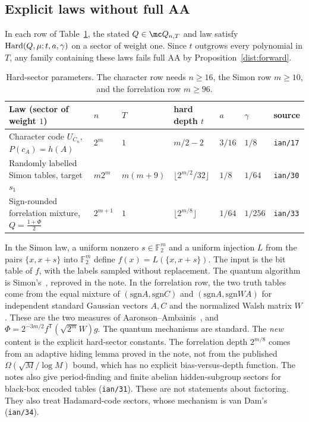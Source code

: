\subsection{Explicit laws without full AA}\label{dist:failures-sec}
\begin{theorem}\label{dist:failures}
In each row of Table~\ref{dist:table}, the stated \(Q\in\mc Q_{n,T}\) and law
satisfy \(\operatorname{Hard}(Q,\mu;t,a,\gamma)\) on a sector of weight one. Since \(t\)
outgrows every polynomial in \(T\), any family containing these laws fails full
AA by Proposition~\ref{dist:forward}.
\end{theorem}
\begin{table}[h]
\centering\small
\begin{tabular}{@{}lllllll@{}}
\toprule
Law (sector of weight \(1\)) & \(n\) & \(T\) & hard depth \(t\) & \(a\) & \(\gamma\) & source\\
\midrule
Character code \(U_{C_n}\), \(P(c_A)=h(A)\) & \(2^m\) & \(1\) & \(m/2-2\) & \(3/16\) & \(1/8\) & \texttt{ian/17}\\
Randomly labelled Simon tables, target \(s_1\) & \(m2^m\) & \(m(m+9)\) & \(\lfloor2^{m/2}/32\rfloor\) & \(1/8\) & \(1/64\) & \texttt{ian/30}\\
Sign-rounded forrelation mixture, \(Q=\frac{1+\Phi}2\) & \(2^{m+1}\) & \(1\) & \(\lfloor2^{m/8}\rfloor\) & \(1/64\) & \(1/256\) & \texttt{ian/33}\\
\bottomrule
\end{tabular}
\caption{Hard-sector parameters. The character row needs \(n\ge16\), the Simon
row \(m\ge10\), and the forrelation row \(m\ge96\).}\label{dist:table}
\end{table}
In the Simon law, a uniform nonzero \(s\in\mathbb F_2^m\) and a uniform injection
\(L\) from the pairs \(\{x,x+s\}\) into \(\mathbb F_2^m\) define
\(f(x)=L(\{x,x+s\})\). The input is the bit table of \(f\), with the labels
sampled without replacement. The quantum algorithm is Simon's~\cite{Sim97},
reproved in the note. In the forrelation row, the two truth tables come from
the equal mixture of \((\mathrm{sgn}A,\mathrm{sgn}C)\) and
\((\mathrm{sgn}A,\mathrm{sgn}WA)\) for independent standard Gaussian vectors
\(A,C\) and the normalized Walsh matrix \(W\). These are the two measures of
Aaronson--Ambainis~\cite{AA15}, and
\(\Phi=2^{-3m/2}f^{\mathsf T}(\sqrt{2^m}W)g\). The quantum mechanisms are
standard. The \emph{new} content is the explicit hard-sector constants. The
forrelation depth \(2^{m/8}\) comes from an adaptive hiding lemma proved in the
note, not from the published \(\Omega(\sqrt M/\log M)\) bound, which has no
explicit bias-versus-depth function. The notes also give period-finding and
finite abelian hidden-subgroup sectors for black-box encoded tables
(\texttt{ian/31}). These are not statements about factoring. They also treat
Hadamard-code sectors, whose mechanism is van Dam's~\cite{vD02}
(\texttt{ian/34}).

